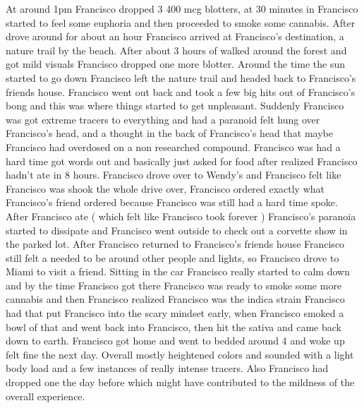 \documentclass[12pt]{book}
\begin{document}
At around 1pm Francisco dropped 3 400 mcg blotters, at 30 minutes in Francisco started to feel some euphoria and then proceeded to smoke some cannabis. After drove around for about an hour Francisco arrived at Francisco's destination, a nature trail by the beach. After about 3 hours of walked around the forest and got mild visuals Francisco dropped one more blotter. Around the time the sun started to go down Francisco left the nature trail and headed back to Francisco's friends house. Francisco went out back and took a few big hits out of Francisco's bong and this was where things started to get unpleasant. Suddenly Francisco was got extreme tracers to everything and had a paranoid felt hung over Francisco's head, and a thought in the back of Francisco's head that maybe Francisco had overdosed on a non researched compound. Francisco was had a hard time got words out and basically just asked for food after realized Francisco hadn't ate in 8 hours. Francisco drove over to Wendy's and Francisco felt like Francisco was shook the whole drive over, Francisco ordered exactly what Francisco's friend ordered because Francisco was still had a hard time spoke. After Francisco ate ( which felt like Francisco took forever ) Francisco's paranoia started to dissipate and Francisco went outside to check out a corvette show in the parked lot. After Francisco returned to Francisco's friends house Francisco still felt a needed to be around other people and lights, so Francisco drove to Miami to visit a friend. Sitting in the car Francisco really started to calm down and by the time Francisco got there Francisco was ready to smoke some more cannabis and then Francisco realized Francisco was the indica strain Francisco had that put Francisco into the scary mindset early, when Francisco smoked a bowl of that and went back into Francisco, then hit the sativa and came back down to earth. Francisco got home and went to bedded around 4 and woke up felt fine the next day. Overall mostly heightened colors and sounded with a light body load and a few instances of really intense tracers. Also Francisco had dropped one the day before which might have contributed to the mildness of the overall experience.
\end{document}
